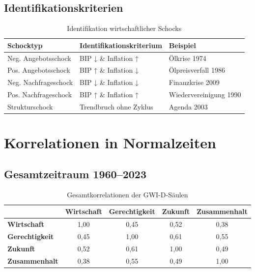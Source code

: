 \subsection{Identifikationskriterien}

\begin{table}[ht]
\centering
\begin{tabular}{lll}
\toprule
\textbf{Schocktyp} & \textbf{Identifikationskriterium} & \textbf{Beispiel} \\
\midrule
Neg. Angebotsschock & BIP ↓ \& Inflation ↑ & Ölkrise 1974 \\
Pos. Angebotsschock & BIP ↑ \& Inflation ↓ & Ölpreisverfall 1986 \\
Neg. Nachfrageschock & BIP ↓ \& Inflation ↓ & Finanzkrise 2009 \\
Pos. Nachfrageschock & BIP ↑ \& Inflation ↑ & Wiedervereinigung 1990 \\
Strukturschock & Trendbruch ohne Zyklus & Agenda 2003 \\
\bottomrule
\end{tabular}
\caption{Identifikation wirtschaftlicher Schocks}
\label{tab:schock-identifikation}
\end{table}

\section{Korrelationen in Normalzeiten}

\subsection{Gesamtzeitraum 1960--2023}

\begin{table}[ht]
\centering
\begin{tabular}{lcccc}
\toprule
 & \textbf{Wirtschaft} & \textbf{Gerechtigkeit} & \textbf{Zukunft} & \textbf{Zusammenhalt} \\
\midrule
\textbf{Wirtschaft} & 1,00 & 0,45 & 0,52 & 0,38 \\
\textbf{Gerechtigkeit} & 0,45 & 1,00 & 0,61 & 0,55 \\
\textbf{Zukunft} & 0,52 & 0,61 & 1,00 & 0,49 \\
\textbf{Zusammenhalt} & 0,38 & 0,55 & 0,49 & 1,00 \\
\bottomrule
\end{tabular}
\caption{Gesamtkorrelationen der GWI-D-Säulen}
\label{tab:gesamt-korrelationen}
\end{table}

